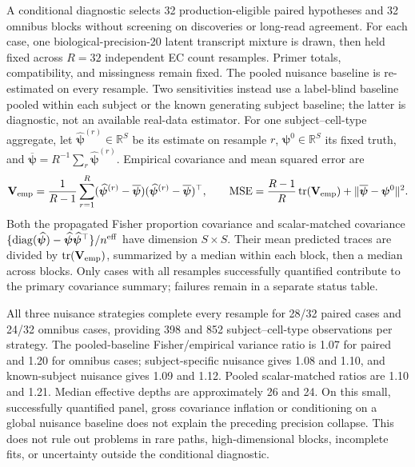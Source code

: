 \documentclass[11pt]{article}
\begin{document}
A conditional diagnostic selects 32 production-eligible paired hypotheses and 32 omnibus blocks without screening on discoveries or long-read agreement. For each case, one biological-precision-20 latent transcript mixture is drawn, then held fixed across \(R=32\) independent EC count resamples. Primer totals, compatibility, and missingness remain fixed. The pooled nuisance baseline is re-estimated on every resample. Two sensitivities instead use a label-blind baseline pooled within each subject or the known generating subject baseline; the latter is diagnostic, not an available real-data estimator. For one subject--cell-type aggregate, let \(\widehat{\boldsymbol\psi}^{(r)}\in\mathbb R^S\) be its estimate on resample \(r\), \(\boldsymbol\psi^0\in\mathbb R^S\) its fixed truth, and \(\overline{\boldsymbol\psi}=R^{-1}\sum_r\widehat{\boldsymbol\psi}^{(r)}\). Empirical covariance and mean squared error are \begin{equation}\mathbf V_{\rm emp}=\frac1{R-1}\sum_{r=1}^R(\widehat{\boldsymbol\psi}^{(r)}-\overline{\boldsymbol\psi})(\widehat{\boldsymbol\psi}^{(r)}-\overline{\boldsymbol\psi})^\top,\qquad \operatorname{MSE}=\frac{R-1}{R}\operatorname{tr}(\mathbf V_{\rm emp})+\|\overline{\boldsymbol\psi}-\boldsymbol\psi^0\|^2.\end{equation} Both the propagated Fisher proportion covariance and scalar-matched covariance \(\{\operatorname{diag}(\widehat{\boldsymbol\psi})-\widehat{\boldsymbol\psi}\widehat{\boldsymbol\psi}^{\top}\}/n^{\rm eff}\) have dimension \(S\times S\). Their mean predicted traces are divided by \(\operatorname{tr}(\mathbf V_{\rm emp})\), summarized by a median within each block, then a median across blocks. Only cases with all resamples successfully quantified contribute to the primary covariance summary; failures remain in a separate status table.

All three nuisance strategies complete every resample for 28/32 paired cases and 24/32 omnibus cases, providing 398 and 852 subject--cell-type observations per strategy. The pooled-baseline Fisher/empirical variance ratio is 1.07 for paired and 1.20 for omnibus cases; subject-specific nuisance gives 1.08 and 1.10, and known-subject nuisance gives 1.09 and 1.12. Pooled scalar-matched ratios are 1.10 and 1.21. Median effective depths are approximately 26 and 24. On this small, successfully quantified panel, gross covariance inflation or conditioning on a global nuisance baseline does not explain the preceding precision collapse. This does not rule out problems in rare paths, high-dimensional blocks, incomplete fits, or uncertainty outside the conditional diagnostic.
\end{document}
